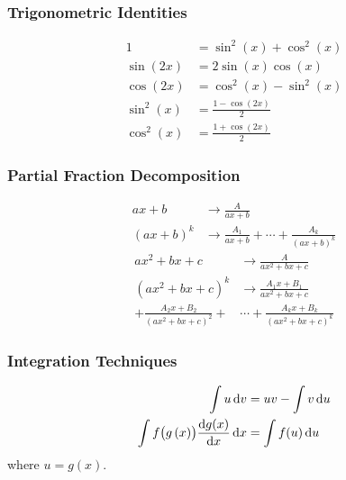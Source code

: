 \documentclass{article}
\begin{document}
\begin{multicols}{3}
    \subsubsection*{Trigonometric Identities}
    \begin{align*}
        1                        & = \sin^2{\left( x \right)} + \cos^2{\left( x \right)} \\
        \sin{\left( 2x \right)}  & = 2\sin{\left( x \right)}\cos{\left( x \right)}       \\
        \cos{\left( 2x \right)}  & = \cos^2{\left( x \right)} - \sin^2{\left( x \right)} \\
        \sin^2{\left( x \right)} & = \frac{1-\cos{\left( 2x \right)}}{2}                 \\
        \cos^2{\left( x \right)} & = \frac{1+\cos{\left( 2x \right)}}{2}
    \end{align*}
    \subsubsection*{Partial Fraction Decomposition}
    \begin{align*}
        ax+b                & \to \displaystyle \frac{A}{ax+b}                                                \\
        \left(ax+b\right)^k & \to \displaystyle \frac{A_1}{ax+b} + \cdots + \frac{A_k}{\left( ax+b \right)^k}
    \end{align*}
    \begin{align*}
        ax^2+bx+c                                       & \to \displaystyle \frac{A}{ax^2+bx+c}                \\
        \left(ax^2+bx+c\right)^k                        & \to \displaystyle \frac{A_1x+B_1}{ax^2+bx+c}         \\
        + \frac{A_2x+B_2}{\left( ax^2+bx+c \right)^2} + & \cdots + \frac{A_kx+B_k}{\left( ax^2+bx+c \right)^k}
    \end{align*}
    \subsubsection*{Integration Techniques}
    \begin{align*}
        \int u \dd{v}                                          & = uv - \int v \dd{u} \\
        \int f\bigl(g\left( x \right)\bigr)\dv{g(x)}{x} \dd{x} & = \int f(u) \dd{u}
    \end{align*}
    where $u = g(x)$.

\end{multicols}
\end{document}
